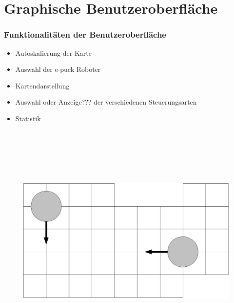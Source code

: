 \documentclass{beamer}
\begin{document}
\section{Graphische Benutzeroberfläche}
\begin{frame}
  \frametitle{Funktionalitäten der Benutzeroberfläche}
  	\begin{itemize}
		\item Autoskalierung der Karte
		\item Auswahl der e-puck Roboter
		\item Kartendarstellung
		\item Auswahl oder Anzeige??? der verschiedenen Steuerungsarten
		\item Statistik
	\end{itemize}  
	\vspace{1cm}
	\begin{figure}[bp]
		\includegraphics[height=12cm]{karte.eps} 
	\end{figure}
\end{frame}
\end{document}
